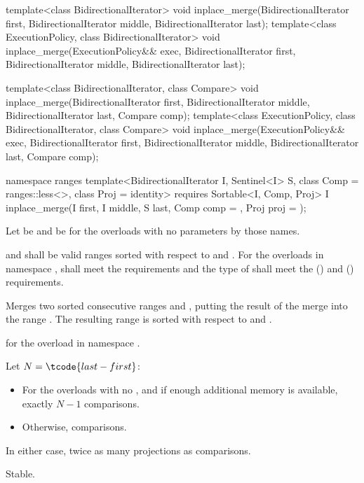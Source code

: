 %
\begin{itemdecl}
template<class BidirectionalIterator>
  void inplace_merge(BidirectionalIterator first,
                     BidirectionalIterator middle,
                     BidirectionalIterator last);
template<class ExecutionPolicy, class BidirectionalIterator>
  void inplace_merge(ExecutionPolicy&& exec,
                     BidirectionalIterator first,
                     BidirectionalIterator middle,
                     BidirectionalIterator last);

template<class BidirectionalIterator, class Compare>
  void inplace_merge(BidirectionalIterator first,
                     BidirectionalIterator middle,
                     BidirectionalIterator last, Compare comp);
template<class ExecutionPolicy, class BidirectionalIterator, class Compare>
  void inplace_merge(ExecutionPolicy&& exec,
                     BidirectionalIterator first,
                     BidirectionalIterator middle,
                     BidirectionalIterator last, Compare comp);

namespace ranges {
  template<BidirectionalIterator I, Sentinel<I> S, class Comp = ranges::less<>,
           class Proj = identity>
    requires Sortable<I, Comp, Proj>
    I inplace_merge(I first, I middle, S last, Comp comp = {}, Proj proj = {});
}
\end{itemdecl}

\begin{itemdescr}
\pnum
Let  be 
and  be 
for the overloads with no parameters by those names.

\pnum
\requires
{} and  shall be valid ranges
sorted with respect to  and .
For the overloads in namespace ,
 shall meet
the  requirements and
the type of  shall meet
the  () and
 () requirements.

\pnum
\effects
Merges two sorted consecutive ranges
 and ,
putting the result of the merge into the range .
The resulting range is sorted with respect to  and .

\pnum
\returns
{} for the overload in namespace .

\pnum
\complexity
Let $N = \tcode{last - first}$:
\begin{itemize}
\item
  For the overloads with no , and
  if enough additional memory is available, exactly $N - 1$ comparisons.
\item
  Otherwise,  comparisons.
\end{itemize}
In either case, twice as many projections as comparisons.

\pnum
\remarks
Stable.
\end{itemdescr}

